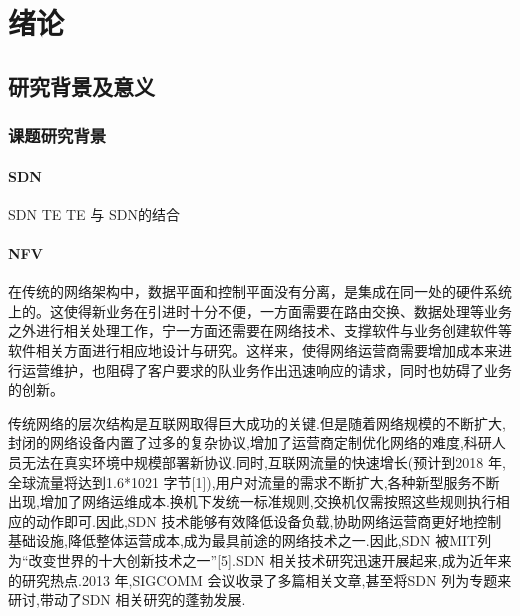 \chapter{绪论}
\section{研究背景及意义}
\subsection{课题研究背景}
\subsubsection{SDN}
SDN
TE
TE 与 SDN的结合


\subsubsection{NFV}


在传统的网络架构中，数据平面和控制平面没有分离，是集成在同一处的硬件系统上的。这使得新业务在引进时十分不便，一方面需要在路由交换、数据处理等业务之外进行相关处理工作，宁一方面还需要在网络技术、支撑软件与业务创建软件等软件相关方面进行相应地设计与研究。这样来，使得网络运营商需要增加成本来进行运营维护，也阻碍了客户要求的队业务作出迅速响应的请求，同时也妨碍了业务的创新。

传统网络的层次结构是互联网取得巨大成功的关键.但是随着网络规模的不断扩大,封闭的网络设备内置了过多的复杂协议,增加了运营商定制优化网络的难度,科研人员无法在真实环境中规模部署新协议.同时,互联网流量的快速增长(预计到2018 年,全球流量将达到1.6*1021 字节[1]),用户对流量的需求不断扩大,各种新型服务不断出现,增加了网络运维成本.换机下发统一标准规则,交换机仅需按照这些规则执行相应的动作即可.因此,SDN 技术能够有效降低设备负载,协助网络运营商更好地控制基础设施,降低整体运营成本,成为最具前途的网络技术之一.因此,SDN 被MIT列为“改变世界的十大创新技术之一”[5].SDN 相关技术研究迅速开展起来,成为近年来的研究热点.2013 年,SIGCOMM 会议收录了多篇相关文章,甚至将SDN 列为专题来研讨,带动了SDN 相关研究的蓬勃发展.

